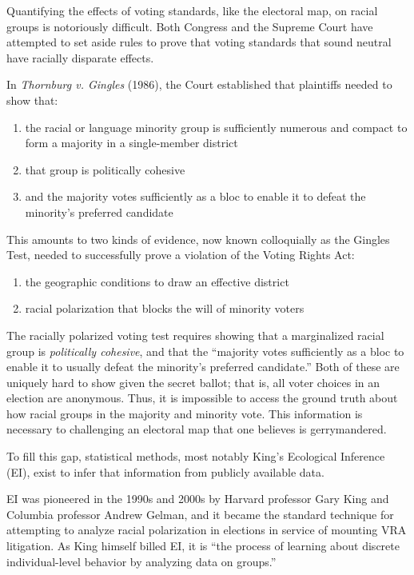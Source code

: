 Quantifying the effects of voting standards, like the electoral map, on racial groups is notoriously difficult. Both Congress and the Supreme Court have attempted to set aside rules to prove that voting standards that sound neutral have racially disparate effects.

In \textit{Thornburg v. Gingles} (1986)\cite{thornburg}, the Court established that plaintiffs needed to show that:

\begin{enumerate}
 \item the racial or language minority group is sufficiently numerous and compact to form a majority in a single-member district
 \item that group is politically cohesive
 \item and the majority votes sufficiently as a bloc to enable it to defeat the minority’s preferred candidate
\end{enumerate}

This amounts to two kinds of evidence, now known colloquially as the Gingles Test, needed to successfully prove a violation of the Voting Rights Act:

\begin{enumerate}
 \item the geographic conditions to draw an effective district
 \item racial polarization that blocks the will of minority voters
\end{enumerate}

The racially polarized voting test requires showing that a marginalized racial group is \textit{politically cohesive}, and that the “majority votes sufficiently as a bloc to enable it to usually defeat the minority’s preferred candidate.” Both of these are uniquely hard to show given the secret ballot; that is, all voter choices in an election are anonymous. Thus, it is impossible to access the ground truth about how racial groups in the majority and minority vote. This information is necessary to challenging an electoral map that one believes is gerrymandered.

To fill this gap, statistical methods, most notably King’s Ecological Inference (EI)\cite{king1999}, exist to infer that information from publicly available data.

EI was pioneered in the 1990s and 2000s by Harvard professor Gary King and Columbia professor Andrew Gelman, and it became the standard technique for attempting to analyze racial polarization in elections in service of mounting VRA litigation. As King himself billed EI, it is “the process of learning about discrete individual-level behavior by analyzing data on groups.”\cite{king1999}

